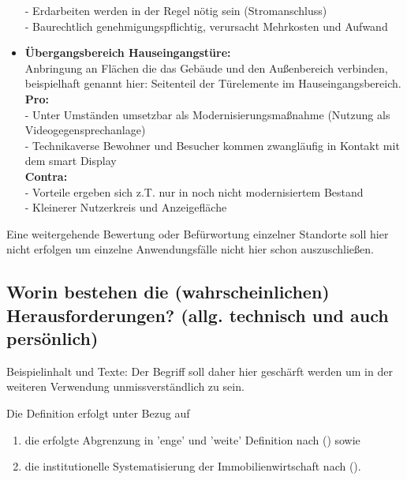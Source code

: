 \begin{itemize}
	  - Erdarbeiten werden in der Regel nötig sein (Stromanschluss)  \\
	  - Baurechtlich genehmigungspflichtig, verursacht Mehrkosten und Aufwand
	  \item \textbf{Übergangsbereich Hauseingangstüre:} 
	  \\ Anbringung an Flächen die das Gebäude und den Außenbereich verbinden, beispielhaft genannt hier: Seitenteil der Türelemente im Hauseingangsbereich.\\
	  \textbf{Pro:}\\
	   - Unter Umständen umsetzbar als Modernisierungsmaßnahme (Nutzung als Videogegensprechanlage)  \\
	   - Technikaverse Bewohner und Besucher kommen zwangläufig in Kontakt mit dem smart Display \\
	  \textbf{Contra:}\\
	   -  Vorteile ergeben sich z.T. nur in noch nicht modernisiertem Bestand \\
	   -  Kleinerer Nutzerkreis und Anzeigefläche \\
 \end{itemize}

Eine weitergehende Bewertung oder Befürwortung einzelner Standorte soll hier nicht erfolgen um einzelne Anwendungsfälle nicht hier schon auszuschließen.


\subsection{Worin bestehen die (wahrscheinlichen) Herausforderungen? (allg. technisch und auch persönlich)}
Beispielinhalt und Texte:
Der Begriff soll daher hier geschärft werden um in der weiteren Verwendung un­miss­ver­ständ­lich zu sein.  

Die Definition erfolgt unter Bezug auf
\begin{enumerate}
	\item  die erfolgte Abgrenzung in 'enge' und 'weite' Definition nach \citeauthor{wirtschaftsfaktorimmo} (\citeyear[S. 9]{wirtschaftsfaktorimmo}) sowie
	\item die institutionelle Systematisierung der Immobilienwirtschaft nach \citeauthor{brauer2011einfuhrung} (\citeyear[S. 26]{brauer2011einfuhrung}).
\end{enumerate}

